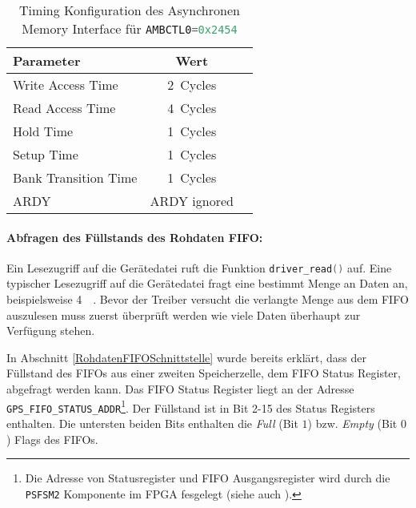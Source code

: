 \begin{table}[htbp]
    \ttabbox
    {
        \caption[EBIU Timing Konfiguration]{Timing Konfiguration des Asynchronen Memory Interface für \lstinline[language=C]$AMBCTL0=0x2454$}
        \label{TabEBIUTimingConfig}
    }
    {
    \begin{tabular}{l c c}
        \toprule
        Parameter               & Wert   \\
        \midrule
        Write Access Time       & \SI{2}{Cycles} \\
        Read Access Time        & \SI{4}{Cycles} \\
        Hold Time               & \SI{1}{Cycles} \\
        Setup Time              & \SI{1}{Cycles} \\
        Bank Transition Time    & \SI{1}{Cycles} \\
        ARDY                    & ARDY ignored \\
        \bottomrule
    \end{tabular}
}
\end{table}


\paragraph{Abfragen des Füllstands des Rohdaten FIFO:}
\label{FuellstandFIFO}
Ein Lesezugriff auf die Gerätedatei ruft die Funktion \lstinline[language=C]$driver_read()$ auf. Eine typischer Lesezugriff auf die Gerätedatei fragt eine bestimmt Menge an Daten an, beispielsweise \SI{4}{\kilo\byte}. Bevor der Treiber versucht die verlangte Menge aus dem FIFO auszulesen muss zuerst überprüft werden wie viele Daten überhaupt zur Verfügung stehen. 

In Abschnitt \ref{RohdatenFIFOSchnittstelle} wurde bereits erklärt, dass der Füllstand des FIFOs aus einer zweiten Speicherzelle, dem FIFO Status Register, abgefragt werden kann. Das FIFO Status Register liegt an der Adresse \lstinline$GPS_FIFO_STATUS_ADDR$\footnote{Die Adresse von Statusregister und FIFO Ausgangsregister wird durch die \lstinline$PSFSM2$ Komponente im FPGA fesgelegt (siehe auch ).}. Der Füllstand ist in Bit 2-15 des Status Registers enthalten. Die untersten beiden Bits enthalten die \emph{Full} (Bit $1$) bzw. \emph{Empty} (Bit $0$) Flags des FIFOs.

